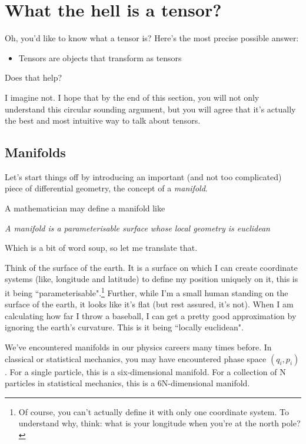 \documentclass{article}
\begin{document}
\section{What the hell is a tensor?}
Oh, you'd like to know what a tensor is? Here's the most precise possible answer:
\begin{itemize}
    \item Tensors are objects that transform as tensors
\end{itemize}

Does that help?

I imagine not. I hope that by the end of this section, you will not only understand this circular sounding argument, but you will agree that it's actually the best and most intuitive way to talk about tensors.

\subsection{Manifolds}
Let's start things off by introducing an important (and not too complicated) piece of differential geometry, the concept of a \textit{manifold}.

A mathematician may define a manifold like

\begin{center}
    \textit{A manifold is a parameterisable surface whose local geometry is euclidean}
\end{center}

Which is a bit of word soup, so let me translate that.

Think of the surface of the earth. It is a surface on which I can create coordinate systems (like, longitude and latitude) to define my position uniquely on it, this is it being ``parameterisable".\footnote{Of course, you can't actually define it with only one coordinate system. To understand why, think: what is your longitude when you're at the north pole?} Further, while I'm a small human standing on the surface of the earth, it looks like it's flat (but rest assured, it's not). When I am calculating how far I throw a baseball, I can get a pretty good approximation by ignoring the earth's curvature. This is it being ``locally euclidean".

We've encountered manifolds in our physics careers many times before. In classical or statistical mechanics, you may have encountered phase space $(q_i, p_i)$. For a single particle, this is a six-dimensional manifold. For a collection of N particles in statistical mechanics, this is a 6N-dimensional manifold.
\end{document}
